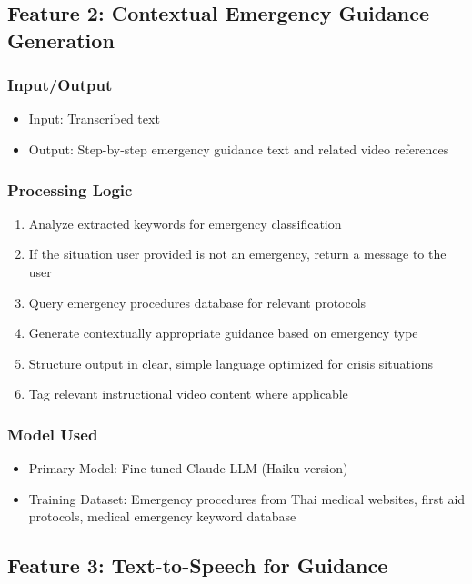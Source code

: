 \subsection{Feature 2: Contextual Emergency Guidance Generation}

\subsubsection{Input/Output}
\begin{itemize}
    \item Input: Transcribed text 
    \item Output: Step-by-step emergency guidance text and related video references
\end{itemize}

\subsubsection{Processing Logic}
\begin{enumerate}
    \item Analyze extracted keywords for emergency classification
    \item If the situation user provided is not an emergency, return a message to the user
    \item Query emergency procedures database for relevant protocols
    \item Generate contextually appropriate guidance based on emergency type
    \item Structure output in clear, simple language optimized for crisis situations
    \item Tag relevant instructional video content where applicable
\end{enumerate}

\subsubsection{Model Used}
\begin{itemize}
    \item Primary Model: Fine-tuned Claude LLM (Haiku version)
    \item Training Dataset: Emergency procedures from Thai medical websites, first aid protocols, medical emergency keyword database
\end{itemize}

\subsection{Feature 3: Text-to-Speech for Guidance}


